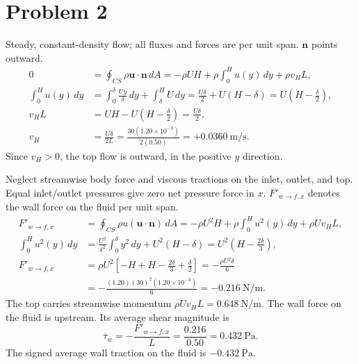 \section*{Problem 2}

Steady, constant-density flow; all fluxes and forces are per unit span.
$\mathbf n$ points outward.
\begin{align*}
0&=\oint_{CS}\rho\mathbf u\cdot\mathbf n\,dA
 =-\rho UH+\rho\int_0^H u(y)\,dy+\rho v_HL,\\
\int_0^H u(y)\,dy
&=\int_0^\delta\frac{Uy}{\delta}\,dy+\int_\delta^H U\,dy
 =\frac{U\delta}{2}+U(H-\delta)
 =U\left(H-\frac{\delta}{2}\right),\\
v_HL&=UH-U\left(H-\frac{\delta}{2}\right)=\frac{U\delta}{2},\\
v_H&=\frac{U\delta}{2L}
 =\frac{30(1.20\times10^{-3})}{2(0.50)}
 =\boxed{+0.0360~\mathrm{m/s}}.
\end{align*}
Since $v_H>0$, the top flow is outward, in the positive $y$ direction.

Neglect streamwise body force and viscous tractions on the inlet, outlet,
and top. Equal inlet/outlet pressures give zero net pressure force in $x$.
$F'_{w\to f,x}$ denotes the wall force on the fluid per unit span.
\begin{align*}
F'_{w\to f,x}
&=\oint_{CS}\rho u(\mathbf u\cdot\mathbf n)\,dA
 =-\rho U^2H+\rho\int_0^H u^2(y)\,dy+\rho Uv_HL,\\
\int_0^H u^2(y)\,dy
&=\frac{U^2}{\delta^2}\int_0^\delta y^2\,dy+U^2(H-\delta)
 =U^2\left(H-\frac{2\delta}{3}\right),\\
F'_{w\to f,x}
&=\rho U^2\left[-H+H-\frac{2\delta}{3}+\frac{\delta}{2}\right]
 =-\frac{\rho U^2\delta}{6}\\
&=-\frac{(1.20)(30)^2(1.20\times10^{-3})}{6}
 =\boxed{-0.216~\mathrm{N/m}}.
\end{align*}
The top carries streamwise momentum $\rho Uv_HL=0.648~\mathrm{N/m}$.
The wall force on the fluid is upstream. Its average shear magnitude is
\[
\boxed{\overline\tau_w=-\frac{F'_{w\to f,x}}{L}
=\frac{0.216}{0.50}=0.432~\mathrm{Pa}}.
\]
The signed average wall traction on the fluid is $-0.432~\mathrm{Pa}$.

